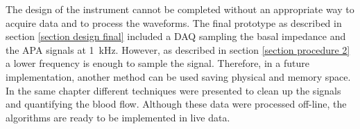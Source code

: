 The design of the instrument cannot be completed without an appropriate way to acquire data and to process the waveforms. The final prototype as described in section \ref{section design final} included a DAQ sampling the basal impedance and the APA signals at \SI{1}{\kHz}. However, as described in section \ref{section procedure 2} a lower frequency is enough to sample the signal. Therefore, in a future implementation, another method can be used saving physical and memory space. In the same chapter different techniques were presented to clean up the signals and quantifying the blood flow. Although these data were processed off-line, the algorithms are ready to be implemented in live data.


